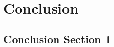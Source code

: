 %
\chapter{Conclusion}
\label{sec:conclusion}


\section{Conclusion Section 1}
\label{sec:conclusion:sec1}


